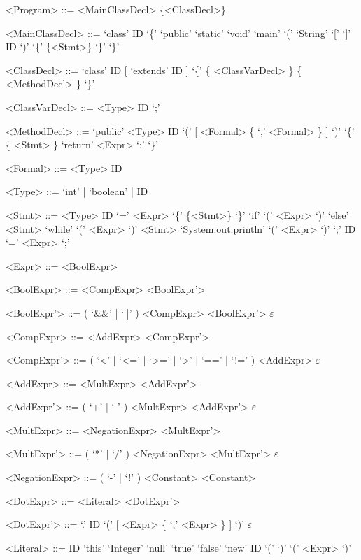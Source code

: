 \documentclass{report}
\begin{document}
\setlength{\grammarparsep}{8pt} %
\setlength{\grammarindent}{12em} %

\begin{grammar}

<Program> ::= <MainClassDecl> \{<ClassDecl>\}

<MainClassDecl> ::= `class' ID `\{' `public' `static' `void' `main' `(' `String' `[' `]' ID `)' `\{' \{<Stmt>\} `\}' `\}'

<ClassDecl> ::= `class' ID [ `extends' ID ] `\{' \{ <ClassVarDecl> \} \{ <MethodDecl> \} `\}'

<ClassVarDecl> ::= <Type> ID `;'

<MethodDecl> ::= `public' <Type> ID `(' [ <Formal> \{ `,' <Formal> \} ] `)' `\{' \{ <Stmt> \} `return' <Expr> `;' `\}'

<Formal> ::= <Type> ID

<Type> ::= `int' | `boolean' | ID

<Stmt> ::= <Type> ID `=' <Expr>
\alt `\{' \{<Stmt>\} `\}'
\alt `if' `(' <Expr> `)' `else' <Stmt>
\alt `while' `(' <Expr> `)' <Stmt>
\alt `System.out.println' `(' <Expr> `)' `;'
\alt ID `=' <Expr> `;'

<Expr> ::= <BoolExpr>

<BoolExpr> ::= <CompExpr> <BoolExpr'>

<BoolExpr'> ::= ( `&&' | `||' ) <CompExpr> <BoolExpr'>
\alt $\varepsilon$

<CompExpr> ::= <AddExpr> <CompExpr'>

<CompExpr'> ::= ( `<' | `<=' | `>=' | `>' | `==' | `!=' ) <AddExpr>
\alt $\varepsilon$

<AddExpr> ::= <MultExpr> <AddExpr'>

<AddExpr'> ::= ( `+' | `-' ) <MultExpr> <AddExpr'>
\alt $\varepsilon$


<MultExpr> ::= <NegationExpr> <MultExpr'>

<MultExpr'> ::= ( `*' | `/' ) <NegationExpr> <MultExpr'>
\alt $\varepsilon$

<NegationExpr> ::= ( `-' | `!' ) <Constant>
\alt <Constant>

<DotExpr> ::= <Literal> <DotExpr'>

<DotExpr'> ::= `.' ID `(' [ <Expr> \{ `,' <Expr> \} ] `)'
\alt $\varepsilon$

<Literal> ::= ID
\alt `this'
\alt `Integer'
\alt `null'
\alt `true'
\alt `false'
\alt `new' ID `(' `)'
\alt `(' <Expr> `)'

\end{grammar}
\end{document}
